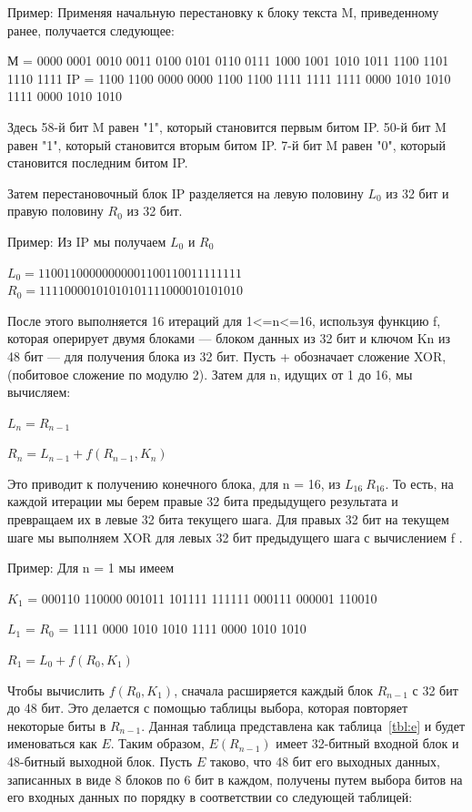 Пример: Применяя начальную перестановку к блоку текста M, приведенному ранее, получается следующее:

М = 0000 0001 0010 0011 0100 0101 0110 0111 1000 1001 1010 1011 1100 1101 1110 1111
IP = 1100 1100 0000 0000 1100 1100 1111 1111 1111 0000 1010 1010 1111 0000 1010 1010

Здесь 58-й бит M равен "1", который становится первым битом IP. 50-й бит M равен "1", который становится вторым битом IP. 7-й бит M равен "0", который становится последним битом IP.

Затем перестановочный блок IP разделяется на левую половину $L_{0}$ из 32 бит и правую половину $R_0$ из 32 бит.

Пример: Из IP мы получаем $L_0$ и $R_0$

$L_0 = 1100 1100 0000 0000 1100 1100 1111 1111$
$R_0 = 1111 0000 1010 1010 1111 0000 1010 1010$

После этого выполняется 16 итераций для 1<=n<=16, используя функцию f, которая оперирует двумя блоками --- блоком данных из 32 бит и ключом Kn из 48 бит --- для получения блока из 32 бит. 
Пусть + обозначает сложение XOR, (побитовое сложение по модулю 2). 
Затем для n, идущих от 1 до 16, мы вычисляем:

$L_n = R_{n-1}$

$R_n = L_{n-1} + f(R_{n-1},K_{n})$

Это приводит к получению конечного блока, для n = 16, из $L_{16}\ R_{16}$. То есть, на каждой итерации мы берем правые 32 бита предыдущего результата и превращаем их в левые 32 бита текущего шага. Для правых 32 бит на текущем шаге мы выполняем XOR для левых 32 бит предыдущего шага с вычислением f .

Пример: Для n = 1 мы имеем

$K_1$ = 000110 110000 001011 101111 111111 000111 000001 110010

$L_1$ = $R_0$ = 1111 0000 1010 1010 1111 0000 1010 1010

$R_1 = L_0 + f(R_0,K_1)$

Чтобы вычислить $f(R_0,K_1)$, сначала расширяется каждый блок $R_{n-1}$ с 32 бит до 48 бит. 
Это делается с помощью таблицы выбора, которая повторяет некоторые биты в $R_{n-1}$. 
Данная таблица представлена как таблица~\ref{tbl:e} и будет именоваться как $E$. 
Таким образом, $E(R_{n-1})$ имеет 32-битный входной блок и 48-битный выходной блок.
Пусть $E$ таково, что 48 бит его выходных данных, записанных в виде 8 блоков по 6 бит в каждом, получены путем выбора битов на его входных данных по порядку в соответствии со следующей таблицей:

